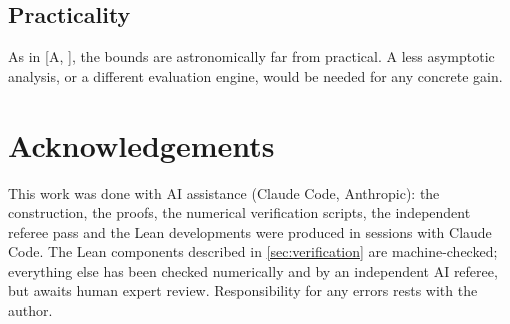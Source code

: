 \documentclass[11pt]{amsart}
\theoremstyle{plain}
\theoremstyle{definition}
\theoremstyle{remark}
\numberwithin{equation}{section}
\newcommand{\A}[1][]{\textup{[A\if\relax\detokenize{#1}\relax\else, #1\fi]}}
\begin{document}
\subsection{Practicality} As in \A, the bounds are astronomically far from practical. A less
asymptotic analysis, or a different evaluation engine, would be needed for any concrete gain.

\section*{Acknowledgements}
This work was done with AI assistance (Claude Code, Anthropic): the construction, the proofs,
the numerical verification scripts, the independent referee pass and the Lean developments were
produced in sessions with Claude Code. The Lean components described in \cref{sec:verification}
are machine-checked; everything else has been checked numerically and by an independent AI
referee, but awaits human expert review. Responsibility for any errors rests with the author.



\end{document}
